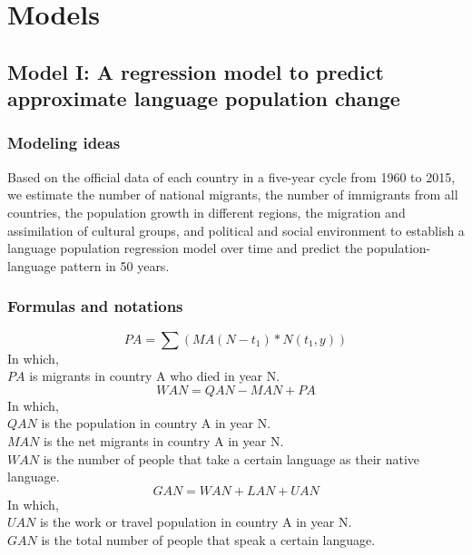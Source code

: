 \documentclass{mcmthesis}
\begin{document}
\section{Models}
\subsection{Model I: A regression model to predict approximate language population change}
\subsubsection{Modeling ideas}
\hspace*{8mm}Based on the official data of each country in a five-year cycle from 1960 to 2015, we estimate the number of national migrants, the number of immigrants from all countries, the population growth in different regions, the migration and assimilation of cultural groups, and political and social environment to establish a language population regression model over time and predict the population-language pattern in 50 years.
\subsubsection{Formulas and notations}
\begin{equation}
PA = \sum(MA(N-t_1)*N(t_1,y))
\end{equation}
In which, \\
$PA$ is migrants in country A who died in year N.
\begin{equation}
WAN = QAN - MAN + PA
\end{equation}
In which, \\
$QAN$ is the population in country A in year N. \\
$MAN$ is the net migrants in country A in year N. \\
$WAN$ is the number of people that take a certain language as their native language. \\
\begin{equation}
GAN = WAN + LAN + UAN 
\end{equation}
In which, \\
$UAN$ is the work or travel population in country A in year N.\\
$GAN$ is the total number of people that speak a certain language.\\
\end{document}
